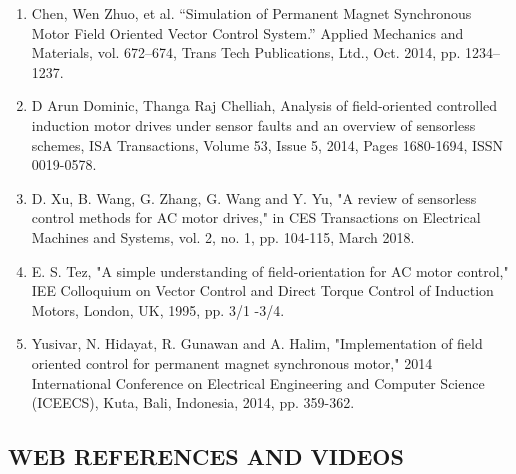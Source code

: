 \begin{enumerate}
      \item Chen, Wen Zhuo, et al. “Simulation of Permanent Magnet Synchronous Motor Field Oriented Vector Control System.” Applied Mechanics and Materials, vol. 672–674, Trans Tech Publications, Ltd., Oct. 2014, pp. 1234–1237.


            \vspace{5mm} %

      \item D Arun Dominic, Thanga Raj Chelliah,
            Analysis of field-oriented controlled induction motor drives under sensor faults and an overview of sensorless schemes,
            ISA Transactions,
            Volume 53, Issue 5,
            2014,
            Pages 1680-1694,
            ISSN 0019-0578.

            \vspace{5mm} %

      \item D. Xu, B. Wang, G. Zhang, G. Wang and Y. Yu, "A review of sensorless control methods for AC motor drives," in CES Transactions on Electrical Machines and Systems, vol. 2, no. 1, pp. 104-115, March 2018.


            \vspace{5mm} %

      \item  E. S. Tez, "A simple understanding of field-orientation for AC motor control," IEE Colloquium on Vector Control and Direct Torque Control of Induction Motors, London, UK, 1995, pp. 3/1 -3/4.

            \vspace{5mm} %


      \item  Yusivar, N. Hidayat, R. Gunawan and A. Halim, "Implementation of field oriented control for permanent magnet synchronous motor," 2014 International Conference on Electrical Engineering and Computer Science (ICEECS), Kuta, Bali, Indonesia, 2014, pp. 359-362.

\end{enumerate}
\subsection*{WEB REFERENCES AND VIDEOS}


